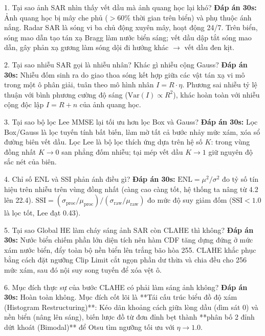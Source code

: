 \documentclass[11pt,a4paper]{article}
\begin{document}
\begin{qabox}{1. Tại sao ảnh SAR nhìn thấy vết dầu mà ảnh quang học lại khó?}
\textbf{Đáp án 30s:} Ảnh quang học bị mây che phủ ($>60\%$ thời gian trên biển) và phụ thuộc ánh nắng. Radar SAR là sóng vi ba chủ động xuyên mây, hoạt động 24/7. Trên biển, sóng mao dẫn tạo tán xạ Bragg làm nước biển sáng; vết dầu dập tắt sóng mao dẫn, gây phản xạ gương làm sóng dội đi hướng khác $\rightarrow$ vết dầu đen kịt.
\end{qabox}

\begin{qabox}{2. Tại sao nhiễu SAR gọi là nhiễu nhân? Khác gì nhiễu cộng Gauss?}
\textbf{Đáp án 30s:} Nhiễu đốm sinh ra do giao thoa sóng kết hợp giữa các vật tán xạ vi mô trong một ô phân giải, tuân theo mô hình nhân $I = R \cdot \eta$. Phương sai nhiễu tỷ lệ thuận với bình phương cường độ sáng ($\text{Var}(I) \propto R^2$), khác hoàn toàn với nhiễu cộng độc lập $I = R + n$ của ảnh quang học.
\end{qabox}

\begin{qabox}{3. Tại sao bộ lọc Lee MMSE lại tối ưu hơn lọc Box và Gauss?}
\textbf{Đáp án 30s:} Lọc Box/Gauss là lọc tuyến tính bất biến, làm mờ tất cả bước nhảy mức xám, xóa sổ đường biên vết dầu. Lọc Lee là bộ lọc thích ứng dựa trên hệ số $K$: trong vùng đồng nhất $K \to 0$ san phẳng đốm nhiễu; tại mép vết dầu $K \to 1$ giữ nguyên độ sắc nét của biên.
\end{qabox}

\begin{qabox}{4. Chỉ số ENL và SSI phản ánh điều gì?}
\textbf{Đáp án 30s:} $\text{ENL} = \mu^2 / \sigma^2$ đo tỷ số tín hiệu trên nhiễu trên vùng đồng nhất (càng cao càng tốt, hệ thống ta nâng từ 4.2 lên 22.4). $\text{SSI} = (\sigma_{\text{proc}}/\mu_{\text{proc}}) / (\sigma_{\text{raw}}/\mu_{\text{raw}})$ đo mức độ suy giảm đốm ($\text{SSI} < 1.0$ là lọc tốt, Lee đạt 0.43).
\end{qabox}

\begin{qabox}{5. Tại sao Global HE làm cháy sáng ảnh SAR còn CLAHE thì không?}
\textbf{Đáp án 30s:} Nước biển chiếm phần lớn diện tích nên hàm CDF tăng dựng đứng ở mức xám nước biển, đẩy toàn bộ nền biển lên trắng bão hòa 255. CLAHE khắc phục bằng cách đặt ngưỡng Clip Limit cắt ngọn phần dư thừa và chia đều cho 256 mức xám, sau đó nội suy song tuyến để xóa vệt ô.
\end{qabox}

\begin{qabox}{6. Mục đích thực sự của bước CLAHE có phải làm sáng ảnh không?}
\textbf{Đáp án 30s:} Hoàn toàn không. Mục đích cốt lõi là **Tái cấu trúc biểu đồ độ xám (Histogram Restructuring)**: Kéo dãn khoảng cách giữa lòng dầu (dìm sát 0) và nền biển (nâng lên sáng), biến lược đồ từ đơn đỉnh bẹt thành **phân bố 2 đỉnh dứt khoát (Bimodal)** để Otsu tìm ngưỡng tối ưu với $\eta \to 1.0$.
\end{qabox}
\end{document}
